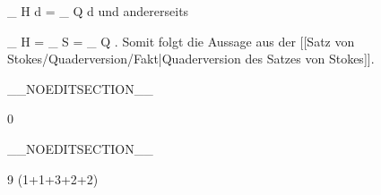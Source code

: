 {{\mavergleichskettedisp
{\vergleichskette
{
\int_{ H  }  d\omega
}
{ =} {
\int_{ Q  }  d\omega
}
{ } {
}
{ } {
}
{ } {
}
}
{}{}{}
und andererseits

\mavergleichskettedisp
{\vergleichskette
{
\int_{  \partial H  }   \omega
}
{ =} {
\int_{  S  }   \omega
}
{ =} {
\int_{  \partial Q  }   \omega
}
{ } {
}
{ } {
}
}
{}{}{.}
Somit folgt die Aussage
aus der [[Satz von Stokes/Quaderversion/Fakt|Quaderversion des Satzes von Stokes]].}
{}

 }

__NOEDITSECTION__

{0}

{

}
{  }

__NOEDITSECTION__

{9 (1+1+3+2+2)}

